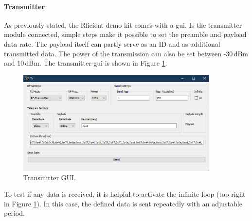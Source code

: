 \paragraph{Transmitter}
As previously stated, the Rficient demo kit comes with a \acs{gui}.
Is the transmitter module connected, simple steps make it possible to set the preamble and payload data rate. 
The payload itself can partly serve as an ID and as additional transmitted data.
The power of the transmission can also be set between -30\,dBm and 10\,dBm.
The transmitter-\acs{gui} is shown in Figure \ref{development:tx}.
\begin{figure}[ht]
	\centering
	\includegraphics[width=0.9\textwidth]{4-development/hardware/graphics/TXgui.png}
	\caption{Transmitter GUI.\label{development:tx}}
\end{figure}
To test if any data is received, it is helpful to activate the infinite loop (top right in Figure \ref{development:tx}).
In this case, the defined data is sent repeatedly with an adjustable period.

